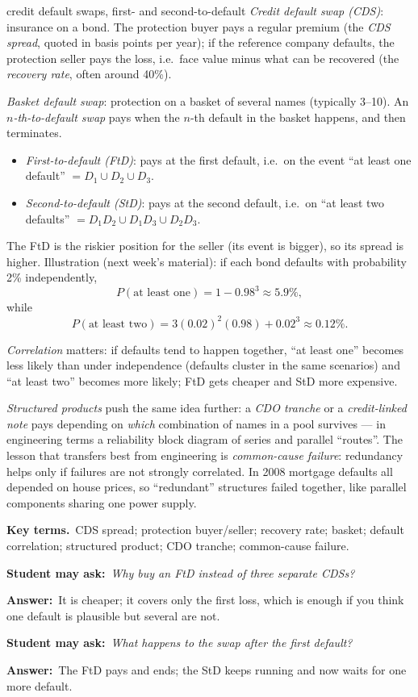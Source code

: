 \documentclass[11pt,a4paper,parskip=half]{scrartcl}
\newcommand{\terms}{\par\textbf{\color{plum}Key terms.}\ }
\newcommand{\sq}[1]{\par\textbf{\color{plum}Student may ask:}\ \emph{#1}\par}
\newcommand{\ans}{\textbf{Answer:}\ }
\begin{document}
\begin{bg}{credit default swaps, first- and second-to-default}
	\emph{Credit default swap (CDS)}: insurance on a bond. The protection
	buyer pays a regular premium (the \emph{CDS spread}, quoted in basis
	points per year); if the reference company defaults, the protection seller
	pays the loss, i.e.\ face value minus what can be recovered (the
	\emph{recovery rate}, often around 40\%).

	\emph{Basket default swap}: protection on a basket of several names
	(typically 3--10). An \emph{$n$-th-to-default swap} pays when the $n$-th
	default in the basket happens, and then terminates.
	\begin{itemize}[nosep]
		\item \emph{First-to-default (FtD)}: pays at the first default, i.e.\ on
		      the event ``at least one default'' $=D_1\cup D_2\cup D_3$.
		\item \emph{Second-to-default (StD)}: pays at the second default, i.e.\
		      on ``at least two defaults'' $=D_1D_2\cup D_1D_3\cup D_2D_3$.
	\end{itemize}
	The FtD is the riskier position for the seller (its event is bigger), so
	its spread is higher. Illustration (next week's material): if each bond
	defaults with probability 2\% independently,
	\[ P(\text{at least one}) = 1-0.98^3 \approx 5.9\%, \]
	while
	\[ P(\text{at least two}) = 3(0.02)^2(0.98)+0.02^3\approx 0.12\%. \]

	\emph{Correlation} matters: if defaults tend to happen together, ``at least
	one'' becomes less likely than under independence (defaults cluster in the
	same scenarios) and ``at least two'' becomes more likely; FtD gets cheaper
	and StD more expensive.

	\emph{Structured products} push the same idea further: a \emph{CDO
		tranche} or a \emph{credit-linked note} pays depending on \emph{which}
	combination of names in a pool survives --- in engineering terms a
	reliability block diagram of series and parallel ``routes''. The lesson
	that transfers best from engineering is \emph{common-cause failure}:
	redundancy helps only if failures are not strongly correlated. In 2008
	mortgage defaults all depended on house prices, so ``redundant''
	structures failed together, like parallel components sharing one power
	supply.

	\terms CDS spread; protection buyer/seller; recovery rate; basket; default
	correlation; structured product; CDO tranche; common-cause failure.

	\sq{Why buy an FtD instead of three separate CDSs?}
	\ans It is cheaper; it covers only the first loss, which is enough if you
	think one default is plausible but several are not.

	\sq{What happens to the swap after the first default?}
	\ans The FtD pays and ends; the StD keeps running and now waits for one
	more default.
\end{bg}
\end{document}
